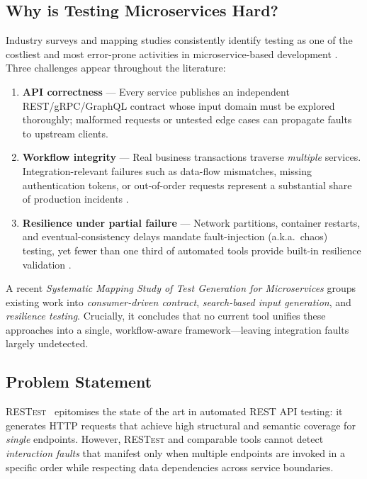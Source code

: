 \documentclass[conference]{IEEEtran}
\begin{document}
\subsection*{Why is Testing Microservices Hard?}
Industry surveys and mapping studies consistently identify testing as
one of the costliest and most error-prone activities in
microservice-based development
\cite{waseem2020testing,miao2025sms}.  
Three challenges appear throughout the literature:

\begin{enumerate}[leftmargin=*,label=\roman*)]
  \item \textbf{API correctness} — Every service publishes an
        independent REST/gRPC/GraphQL contract whose input domain must be
        explored thoroughly; malformed requests or untested edge cases
        can propagate faults to upstream clients.
  \item \textbf{Workflow integrity} — Real business transactions
        traverse \emph{multiple} services.  
        Integration-relevant failures such as data-flow mismatches,
        missing authentication tokens, or out-of-order requests
        represent a substantial share of production incidents
        \cite{zhou2018microservice}.
  \item \textbf{Resilience under partial failure} — Network partitions,
        container restarts, and eventual-consistency delays mandate
        fault-injection (a.k.a.\ chaos) testing, yet fewer than one
        third of automated tools provide built-in resilience validation
        \cite{waseem2020testing}.
\end{enumerate}

A recent \emph{Systematic Mapping Study of Test Generation for
Microservices} \cite{miao2025sms} groups existing work into
\textit{consumer-driven contract}, \textit{search-based input
generation}, and \textit{resilience testing}.  Crucially, it concludes
that no current tool unifies these approaches into a single,
workflow-aware framework—leaving integration faults largely
undetected.

\subsection*{Problem Statement}
\textsc{RESTest}~\cite{martin2019restest} epitomises the state of the
art in automated REST API testing: it generates HTTP requests that
achieve high structural and semantic coverage for \emph{single}
endpoints.  However, \textsc{RESTest} and comparable tools cannot
detect \emph{interaction faults} that manifest only when multiple
endpoints are invoked in a specific order while respecting data
dependencies across service boundaries.
\end{document}
